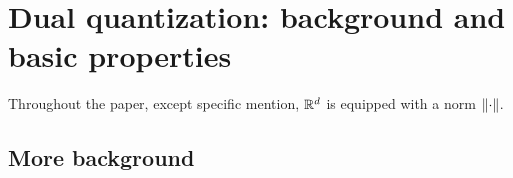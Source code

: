 \section{Dual quantization: background and basic properties}\label{sec:defs}

Throughout  the paper, except specific mention, $\mathbb{R}^d$ is equipped with a norm $\lVert\cdot\rVert$. 

\subsection{More background}



